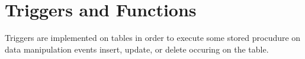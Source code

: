 \section{Triggers and Functions}\label{sec_triggers_and_functions}

Triggers are implemented on tables in order to execute some stored procudure on data manipulation events insert, update, or delete occuring on the table.

		
		
		
    

		
		
		
